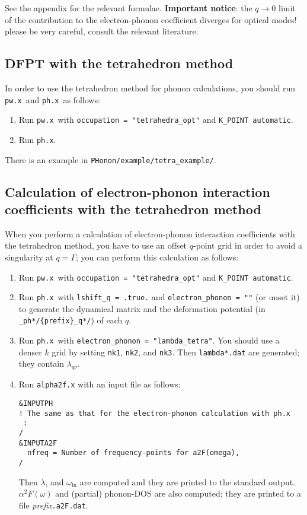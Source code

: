 \documentclass[12pt,a4paper]{article}
\def\pwx{\texttt{pw.x}}
\def\phx{\texttt{ph.x}}
\begin{document}
See the appendix for the relevant formulae.
{\bf Important notice}: the $q\rightarrow 0$ limit of the contribution 
to the electron-phonon coefficient diverges for optical modes! please 
be very careful, consult the relevant literature.

\subsection{DFPT with the tetrahedron method}

In order to use the tetrahedron method for phonon calculations,
you should run \pwx\ and \phx\ as follows:
\begin{enumerate}
  \item Run \pwx\ with \verb|occupation = "tetrahedra_opt"| and \verb|K_POINT automatic|.
  \item Run \phx.
\end{enumerate}

There is an example in \verb|PHonon/example/tetra_example/|.

\subsection{Calculation of electron-phonon interaction coefficients with the tetrahedron method}

When you perform a calculation of electron-phonon interaction coefficients 
with the tetrahedron method,
you have to use an offset $q$-point grid in order to avoid a singularity 
at $q=\Gamma$; you can perform this calculation as follows:

\begin{enumerate}
  \item Run \pwx\ with \verb|occupation = "tetrahedra_opt"| and \verb|K_POINT automatic|.
  \item Run \phx\ with \verb|lshift_q = .true.| and \verb|electron_phonon = ""| (or unset it)
    to generate the dynamical matrix and
    the deformation potential (in \verb|_ph*/{prefix}_q*/|) of each $q$.
  \item Run \phx\ with \verb|electron_phonon = "lambda_tetra"|.
    You should use a denser $k$ grid by setting \verb|nk1|, \verb|nk2|, and \verb|nk3|.
    Then \verb|lambda*.dat| are generated; they contain $\lambda_{q \nu}$.
  \item Run \verb|alpha2f.x| with an input file as follows:
\begin{verbatim}
&INPUTPH
! The same as that for the electron-phonon calculation with ph.x
 :
/
&INPUTA2F
  nfreq = Number of frequency-points for a2F(omega), 
/
\end{verbatim}
Then $\lambda$, and $\omega_{\ln}$ are computed and they are printed to the standard output.
$\alpha^2F(\omega)$ and (partial) phonon-DOS are also computed;
they are printed to a file \textit{prefix}\verb|.a2F.dat|.
\end{enumerate}
\end{document}
